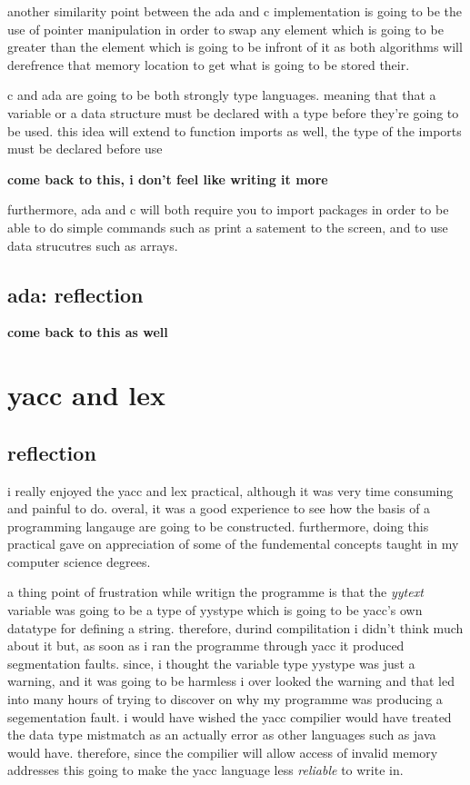 \documentclass[
	12pt, %
]{fphw}
\begin{document}
another similarity point between the ada and c implementation is going to be the
use of pointer manipulation in order to swap any element which is going to be greater
than the element which is going to be infront of it as both algorithms will
derefrence that memory location to get what is going to be stored their.\par

c and ada are going to be both strongly type languages. meaning that that a variable
or a data structure must be declared with a type before they're going to be used.
this idea will extend to function imports as well, the type of the imports must be
declared before use

\textbf{come back to this, i don't feel like writing it more}

furthermore, ada and c will both require you to import packages in order to be able
to do simple commands such as print a satement to the screen, and to use data
strucutres such as arrays. \par

\subsection{ada: reflection}
\textbf{come back to this as well}


\section{yacc and lex}


\subsection{reflection}
i really enjoyed the yacc and lex practical, although it was very time consuming
and painful to do. overal, it was a good experience to see how the basis of
a programming langauge are going to be constructed. furthermore, doing this
practical gave on appreciation of some of the fundemental concepts taught in my
computer science degrees.\par

a thing point of frustration while writign the programme is that the \emph{yytext}
variable was going to be a type of yystype which is going to be yacc's own datatype
for defining a string. therefore, durind compilitation i didn't think much about
it but, as soon as i ran the programme through yacc it produced segmentation faults.
since, i thought the variable type yystype was just a warning, and it was
going to be harmless i over looked the warning and that led into many hours of
trying to discover on why my programme was producing a segementation fault. i
would have wished the yacc compilier would have treated the data type mistmatch
as an actually error as other languages such as java would have. therefore,
since the compilier will allow access of invalid memory addresses this going to
make the yacc language less \emph{reliable} to write in. \par
\end{document}
